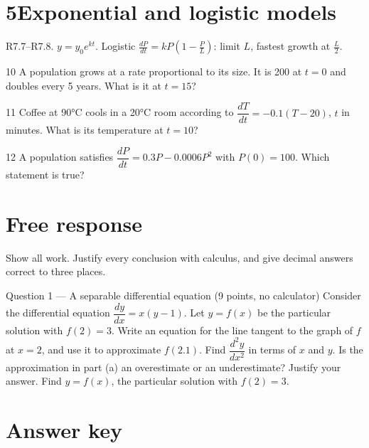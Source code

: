 \documentclass{apcalc}
\begin{document}
\section*{5\quad Exponential and logistic models}
\begin{setrule}R7.7–R7.8. $y=y_0e^{kt}$. Logistic $\frac{dP}{dt}=kP(1-\frac PL)$: limit $L$, fastest growth at $\frac L2$.\end{setrule}
\begin{q}{10}
A population grows at a rate proportional to its size. It is 200 at $t=0$ and doubles every 5 years. What is it at $t=15$?
\end{q}
\begin{q}{11}
Coffee at 90°C cools in a 20°C room according to $\dfrac{dT}{dt}=-0.1(T-20)$, $t$ in minutes. What is its temperature at $t=10$?\calcmark
{}
\end{q}
\begin{q}{12}
A population satisfies $\dfrac{dP}{dt}=0.3P-0.0006P^2$ with $P(0)=100$. Which statement is true?
\end{q}
\clearpage\section*{Free response}
Show all work. Justify every conclusion with calculus, and give decimal answers correct to three places.
\begin{frq}{Question 1 --- A separable differential equation (9 points, no calculator)}
Consider the differential equation $\dfrac{dy}{dx}=x(y-1)$. Let $y=f(x)$ be the particular solution with $f(2)=3$.
Write an equation for the line tangent to the graph of $f$ at $x=2$, and use it to approximate $f(2.1)$.\workspace{1.6in}
Find $\dfrac{d^2y}{dx^2}$ in terms of $x$ and $y$. Is the approximation in part (a) an overestimate or an underestimate? Justify your answer.\workspace{1.6in}
Find $y=f(x)$, the particular solution with $f(2)=3$.\workspace{1.6in}
\end{frq}
\clearpage\section*{Answer key}
\end{document}
